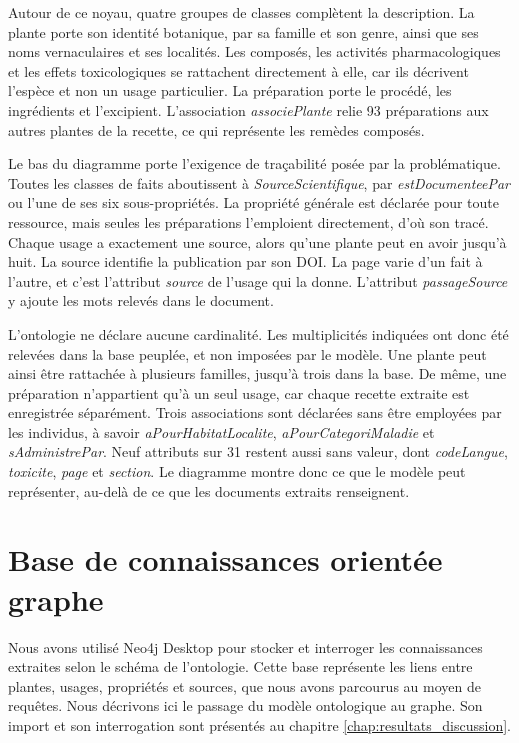 Autour de ce noyau, quatre groupes de classes complètent la description. La plante porte son identité botanique, par sa famille et son genre, ainsi que ses noms vernaculaires et ses localités. Les composés, les activités pharmacologiques et les effets toxicologiques se rattachent directement à elle, car ils décrivent l'espèce et non un usage particulier. La préparation porte le procédé, les ingrédients et l'excipient. L'association \textit{associePlante} relie 93 préparations aux autres plantes de la recette, ce qui représente les remèdes composés.

Le bas du diagramme porte l'exigence de traçabilité posée par la problématique. Toutes les classes de faits aboutissent à \textit{SourceScientifique}, par \textit{estDocumenteePar} ou l'une de ses six sous-propriétés. La propriété générale est déclarée pour toute ressource, mais seules les préparations l'emploient directement, d'où son tracé. Chaque usage a exactement une source, alors qu'une plante peut en avoir jusqu'à huit. La source identifie la publication par son DOI. La page varie d'un fait à l'autre, et c'est l'attribut \textit{source} de l'usage qui la donne. L'attribut \textit{passageSource} y ajoute les mots relevés dans le document.

L'ontologie ne déclare aucune cardinalité. Les multiplicités indiquées ont donc été relevées dans la base peuplée, et non imposées par le modèle. Une plante peut ainsi être rattachée à plusieurs familles, jusqu'à trois dans la base. De même, une préparation n'appartient qu'à un seul usage, car chaque recette extraite est enregistrée séparément. Trois associations sont déclarées sans être employées par les individus, à savoir \textit{aPourHabitatLocalite}, \textit{aPourCategoriMaladie} et \textit{sAdministrePar}. Neuf attributs sur 31 restent aussi sans valeur, dont \textit{codeLangue}, \textit{toxicite}, \textit{page} et \textit{section}. Le diagramme montre donc ce que le modèle peut représenter, au-delà de ce que les documents extraits renseignent.


\section{Base de connaissances orientée graphe}
\label{sec:base_connaissances}

Nous avons utilisé Neo4j Desktop pour stocker et interroger les connaissances extraites selon le schéma de l'ontologie. Cette base représente les liens entre plantes, usages, propriétés et sources, que nous avons parcourus au moyen de requêtes. Nous décrivons ici le passage du modèle ontologique au graphe. Son import et son interrogation sont présentés au chapitre \ref{chap:resultats_discussion}.
\label{subsec:mapping_graphe}

